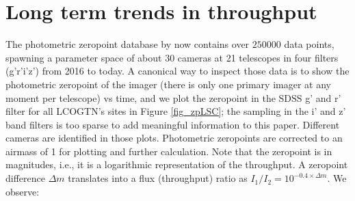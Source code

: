 \documentclass[draft]{spieman}
\begin{document}
\section{Long term trends in throughput}

The photometric zeropoint database by now contains over $250000$ data points, spawning a
parameter space of about 30 cameras at 21 telescopes in four filters (g'r'i'z') from 2016 to today.
A canonical way to inspect those data is to show the photometric zeropoint of the imager
(there is only one primary imager at any moment per telescope) vs time, and we plot the zeropoint in
the SDSS g' and r' filter for all LCOGTN's sites in Figure \ref{fig_zpLSC}; the sampling in the i' 
and z' band filters is too sparse to add meaningful information to this paper. Different cameras
are identified in those plots. Photometric zeropoints are corrected to an airmass of 1 for plotting 
and further calculation. Note that the zeropoint is in magnitudes, i.e., it is a logarithmic 
representation of the throughput. A zeropoint difference $\Delta m$ translates into a flux 
(throughput) ratio as $I_1 / I_2 = 10^{-0.4 \times \Delta m}$.  We observe:
\end{document}
